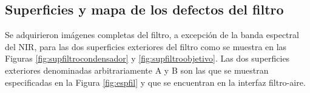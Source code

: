 \singlespacing
\subsection{Superficies y mapa de los defectos del filtro}

\hspace{0.5cm}Se adquirieron imágenes completas del filtro, a excepción de la banda espectral del NIR, para las dos superficies exteriores del filtro como se muestra en las Figuras \ref{fig:supfiltrocondensador} y \ref{fig:supfiltroobjetivo}. Las dos superficies exteriores denominadas arbitrariamente A y B son las que se muestran especificadas en la Figura \ref{fig:espfil} y que se encuentran en la interfaz filtro-aire.

\begin{figure}[H]
	\begin{floatrow}
	\end{floatrow}
\end{figure}

